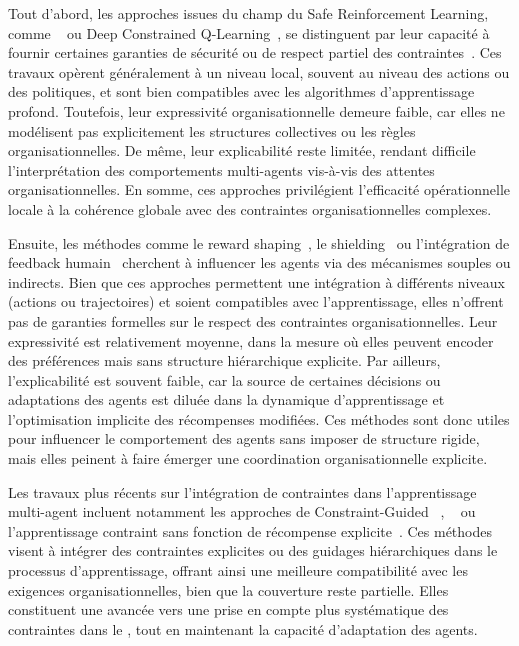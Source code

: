 Tout d'abord, les approches issues du champ du Safe Reinforcement Learning, comme ~\cite{achiam2017constrained} ou Deep Constrained Q-Learning~\cite{kalweit2020deep}, se distinguent par leur capacité à fournir certaines garanties de sécurité ou de respect partiel des contraintes~\cite{garcia2015comprehensive}. Ces travaux opèrent généralement à un niveau local, souvent au niveau des actions ou des politiques, et sont bien compatibles avec les algorithmes d’apprentissage profond. Toutefois, leur expressivité organisationnelle demeure faible, car elles ne modélisent pas explicitement les structures collectives ou les règles organisationnelles. De même, leur explicabilité reste limitée, rendant difficile l'interprétation des comportements multi-agents vis-à-vis des attentes organisationnelles. En somme, ces approches privilégient l'efficacité opérationnelle locale à la cohérence globale avec des contraintes organisationnelles complexes.

Ensuite, les méthodes comme le reward shaping~\cite{ng1999policy}, le shielding~\cite{amodei2016concrete} ou l’intégration de feedback humain~\cite{warnell2018deep, zhou2025mentor} cherchent à influencer les agents via des mécanismes souples ou indirects. Bien que ces approches permettent une intégration à différents niveaux (actions ou trajectoires) et soient compatibles avec l’apprentissage, elles n’offrent pas de garanties formelles sur le respect des contraintes organisationnelles. Leur expressivité est relativement moyenne, dans la mesure où elles peuvent encoder des préférences mais sans structure hiérarchique explicite. Par ailleurs, l’explicabilité est souvent faible, car la source de certaines décisions ou adaptations des agents est diluée dans la dynamique d’apprentissage et l’optimisation implicite des récompenses modifiées. Ces méthodes sont donc utiles pour influencer le comportement des agents sans imposer de structure rigide, mais elles peinent à faire émerger une coordination organisationnelle explicite.

Les travaux plus récents sur l’intégration de contraintes dans l’apprentissage multi-agent incluent notamment les approches de Constraint-Guided ~\cite{spieker2021constraint}, ~\cite{zhou2025mentor} ou l’apprentissage contraint sans fonction de récompense explicite~\cite{miryoosefi2022}. Ces méthodes visent à intégrer des contraintes explicites ou des guidages hiérarchiques dans le processus d’apprentissage, offrant ainsi une meilleure compatibilité avec les exigences organisationnelles, bien que la couverture reste partielle. Elles constituent une avancée vers une prise en compte plus systématique des contraintes dans le , tout en maintenant la capacité d’adaptation des agents.


